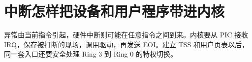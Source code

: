 \chapter{中断怎样把设备和用户程序带进内核}

异常由当前指令引起，硬件中断则可能在任意指令之间到来。内核要从 PIC 接收
IRQ，保存被打断的现场，调用驱动，再发送 EOI。建立 TSS 和用户页表以后，
同一套入口还要安全处理 Ring 3 到 Ring 0 的特权切换。






